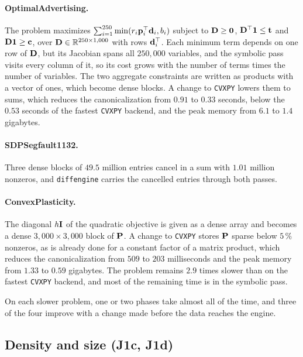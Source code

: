 \documentclass[letterpaper,12pt]{article}
\begin{document}
\paragraph{OptimalAdvertising.} The problem maximizes
$\sum_{i=1}^{250} \min(r_i \mathbf{p}_i^\top \mathbf{d}_i, b_i)$ subject to $\mathbf{D} \ge \mathbf 0$,
$\mathbf{D}^\top \mathbf 1 \le \mathbf{t}$ and $\mathbf{D} \mathbf 1 \ge \mathbf{c}$, over
$\mathbf{D} \in \mathbb{R}^{250 \times 1{,}000}$ with rows $\mathbf{d}_i^\top$. Each minimum term depends
on one row of $\mathbf{D}$, but its Jacobian spans all $250{,}000$ variables, and the symbolic pass
visits every column of it, so its cost grows with the number of terms times the number of
variables. The two aggregate constraints are written as products with a vector of ones, which
become dense blocks. A change to \texttt{CVXPY} lowers them to sums, which reduces the
canonicalization from $0.91$ to $0.33$ seconds, below the $0.53$ seconds of the fastest
\texttt{CVXPY} backend, and the peak memory from $6.1$ to $1.4$ gigabytes.

\paragraph{SDPSegfault1132.} Three dense blocks of $49.5$ million entries cancel in a sum with
$1.01$ million nonzeros, and \texttt{diffengine} carries the cancelled entries through both
passes.

\paragraph{ConvexPlasticity.} The diagonal $h \mathbf{I}$ of the quadratic objective is given as a
dense array and becomes a dense $3{,}000 \times 3{,}000$ block of $\mathbf{P}$. A change to
\texttt{CVXPY} stores $\mathbf{P}$ sparse below $5\,\%$ nonzeros, as is already done for a
constant factor of a matrix product, which reduces the canonicalization from $509$ to $203$
milliseconds and the peak memory from $1.33$ to $0.59$ gigabytes. The problem remains $2.9$
times slower than on the fastest \texttt{CVXPY} backend, and most of the remaining time is in
the symbolic pass.

On each slower problem, one or two phases take almost all of the time, and three of the four
improve with a change made before the data reaches the engine.

\subsection{Density and size (J1c, J1d)}
\end{document}
